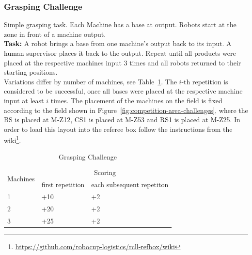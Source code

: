 \documentclass[12pt,twoside]{article}
\newcommand{\reffig}[1]{Figure~\ref{#1}}
\newcommand{\reftab}[1]{Table~\ref{#1}}
\begin{document}
\subsubsection{Grasping Challenge}\label{sec:challenge-grasping}
Simple grasping task.
Each Machine has a base at output.
Robots start at the zone in front of a machine output.\\
\textbf{Task:} A robot brings a base from one machine's output back to its
input. A human supervisor places it back to the output. Repeat until all
products were placed at the respective machines input 3 times and all robots
returned to their starting positions. \\
Variations differ by number of machines, see
\reftab{tab:challenge-grasping}. The $i$-th repetition is considered to be
successful, once all bases were placed at the respective machine input
at least $i$ times.
The placement of the machines on the field is fixed according to the field
shown in \reffig{fig:competition-area-challenges}, where the BS is placed at
M-Z12, CS1 is placed at M-Z53 and RS1 is placed at M-Z25.
In order to load this layout into the referee box follow the instructions
from the
wiki\footnote{\url{https://github.com/robocup-logistics/rcll-refbox/wiki}}.

\begin{table}[!htb]
\centering
 \begin{tabular}{l|l|l}
  \multirow{2}{*}{Machines}
  & \multicolumn{2}{c}{Scoring} \\\cline{2-3}
  & first repetition
  & each subsequent repetiton  \\\hline\hline
  1 & +10 & +2 \\
  2 & +20 & +2 \\
  3 & +25 & +2 \\
 \end{tabular}
 \caption{Grasping Challenge}
 \label{tab:challenge-grasping}
\end{table}
\end{document}
